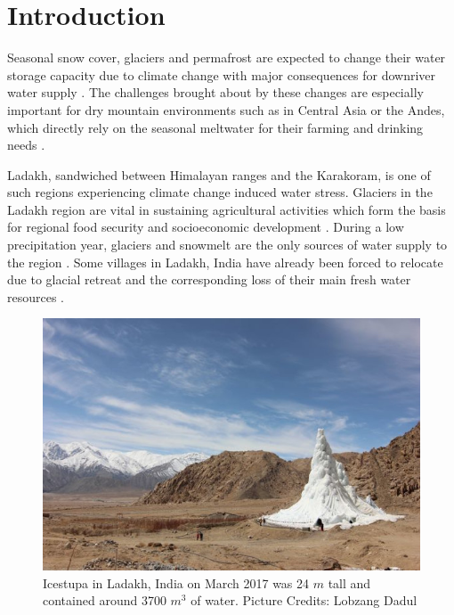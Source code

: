 \documentclass[utf8]{frontiersSCNS}
\begin{document}
\section{Introduction}

Seasonal snow cover, glaciers and permafrost are expected to change their water storage capacity due to climate
change with major consequences for downriver water supply \citep{Immerzeel_2020}. The challenges brought about
by these changes are especially important for dry mountain environments such as in Central Asia or the Andes,
which directly rely on the seasonal meltwater for their farming and drinking needs \citep{HoelzleBarandun_2019,
	Apel_2018, Buytaert_2017, Chen_2016, UNGERSHAYESTEH_2013}.

Ladakh, sandwiched between Himalayan ranges and the Karakoram, is one of such regions experiencing climate
change induced water stress. Glaciers in the Ladakh region are vital in sustaining agricultural activities which
form the basis for regional food security and socioeconomic development \citep{Labbal_2000, Schmidt_2012}.
During a low precipitation year, glaciers and snowmelt are the only sources of water supply to the region
\citep{Thayyen_2010}. Some villages in Ladakh, India have already been forced to relocate due to glacial retreat
and the corresponding loss of their main fresh water resources \citep{zanskar}.

\begin{figure}
	\begin{center}
		\includegraphics[width=10 cm]{Figures/Figure_1.jpg}
	\end{center}
	\caption{Icestupa in Ladakh, India on March 2017 was 24 $m$ tall and contained around 3700 $m^3$
		of water. Picture Credits: Lobzang Dadul}
	\label{fig:old_icestupa}
\end{figure}
\end{document}
